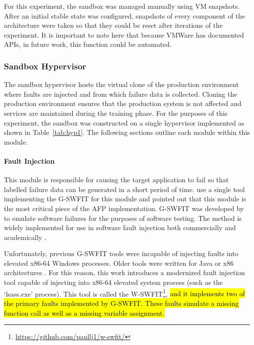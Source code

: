 For this experiment, the sandbox was managed manually using \ac{VM} snapshots.
After an initial stable state was configured, snapshots of every component of
the architecture were taken so that they could be reset after iterations of the
experiment.  It is important to note here that because VMWare has documented
\ac{API}s, in future work, this function could be automated.

\subsubsection{Sandbox Hypervisor} \label{sec:sandbox}
The sandbox hypervisor hosts the virtual clone of the production environment
where faults are injected and from which failure data is collected.  Cloning
the production environment ensures that the production system is not affected
and services are maintained during the training phase.  For the purposes of
this experiment, the sandbox was constructed on a single hypervisor implemented
as shown in Table~\ref{tab:hyp1}.  The following sections outline each module
within this module.

\paragraph{Fault Injection} \label{sec:faultInjectionTool} 
This module is responsible for causing the target application to fail so that
labelled failure data can be generated in a short period of time.
\citet{irrera2015} use a single tool implementing the \ac{G-SWFIT} for this
module and pointed out that this module is the most critical piece of the
\ac{AFP} implementation.  \ac{G-SWFIT} was developed by \citet{gswfit} to
emulate software failures for the purposes of software testing.  The method is
widely implemented for use in software fault injection both commercially and
academically \citep{cotroneo2012,irrera2014,natella2010,umadevi2015}. 

Unfortunately, previous \ac{G-SWFIT} tools were incapable of injecting faults
into elevated x86-64 Windows processes.  Older tools were written for Java or
x86 architectures \citep{gswfit,martins2002jaca,natella2010,sanches2011jswfit}.
For this reason, this work introduces a modernized fault injection tool capable
of injecting into x86-64 elevated system process (such as the `lsass.exe'
process).  This tool is called the
\ac{W-SWFIT}\footnote{\url{https://github.com/paullj1/w-swfit/}}, \hl{and it 
implements two of the primary faults implemented by \ac{G-SWFIT}.  These faults
simulate a missing function call as well as a missing variable assignment.}

